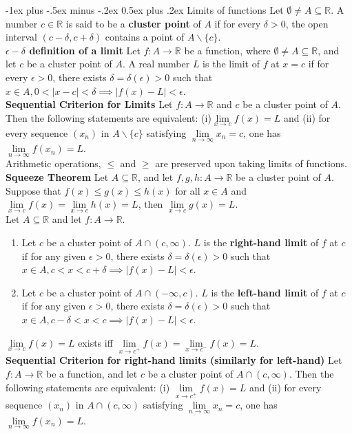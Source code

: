 \documentclass[10pt,landscape]{article}
\makeatletter
\renewcommand{\section}{\@startsection{section}{1}{0mm}%
                                {-1ex plus -.5ex minus -.2ex}%
                                {0.5ex plus .2ex}%
                                {\normalfont\large\bfseries}}
\makeatother
\begin{document}
\begin{multicols}{3}
\section{Limits of functions}
Let $\emptyset\neq A\subseteq\mathbb{R}$. A number  $c\in\mathbb{R}$ is said to be a \textbf{cluster point} of  $A$ if for every  $\delta>0$, the open interval  $(c-\delta,c+\delta)$ contains a point of  $A\backslash\{c\}$.\\
\textbf{$\epsilon-\delta$ definition of a limit} Let $f:A\to\mathbb{R}$ be a function, where  $\emptyset\neq A\subseteq\mathbb{R}$, and let  $c$ be a cluster point of  $A$. A real number  $L$ is the limit of  $f$ at  $x=c$ if for every  $\epsilon>0$, there exists  $\delta=\delta(\epsilon)>0$ such that $x\in A, 0<|x-c|<\delta\implies |f(x)-L|<\epsilon$.\\
\textbf{Sequential Criterion for Limits} Let $f:A\to\mathbb{R}$ and  $c$ be a cluster point of $A$. Then the following statements are equivalent: (i)$\lim\limits_{x\to c}f(x)=L$ and (ii) for every sequence $(x_n)$ in  $A\backslash\{c\}$ satisfying  $\lim\limits_{n\to\infty}x_n=c$, one has  $\lim\limits_{n\to\infty}f(x_n)=L$.\\
Arithmetic operations, $\leq$ and  $\geq$ are preserved upon taking limits of functions.\\
\textbf{Squeeze Theorem} Let $A\subseteq\mathbb{R}$, and let  $f,g,h:A\to\mathbb{R}$ be a cluster point of  $A$. Suppose that  $f(x)\leq g(x)\leq h(x)$ for all $x\in A$ and  $\lim\limits_{x\to c}f(x)=\lim\limits_{x\to c}h(x)=L$, then  $\lim\limits_{x\to c}g(x)=L$.\\
Let $A\subseteq\mathbb{R}$ and let  $f:A\to\mathbb{R}$.
 \begin{enumerate}
	 \item Let $c$ be a cluster point of  $A\cap(c,\infty)$.  $L$ is the \textbf{right-hand limit} of  $f$ at  $c$ if for any given  $\epsilon>0$, there exists $\delta=\delta(\epsilon)>0$ such that  $x\in A, c<x<c+\delta\implies|f(x)-L|<\epsilon$.
	 \item Let $c$ be a cluster point of  $A\cap(-\infty, c)$.  $L$ is the \textbf{left-hand limit} of  $f$ at  $c$ if for any given  $\epsilon>0$, there exists  $\delta=\delta(\epsilon)>0$ such that  $x\in A,c-\delta<x<c\implies|f(x)-L|<\epsilon$.
\end{enumerate}
$\lim\limits_{x\to c}f(x)=L$ exists iff  $\lim\limits_{x\to c^+}f(x)=\lim\limits_{x\to c^-}f(x)=L$.\\
\textbf{Sequential Criterion for right-hand limits (similarly for left-hand)} Let $f: A\to\mathbb{R}$ be a function, and let  $c$ be a cluster point of  $A\cap(c,\infty)$. Then the following statements are equivalent: (i)  $\lim\limits_{x\to c^+}f(x)=L$ and (ii) for every sequence $(x_n)$ in  $A\cap(c,\infty)$ satisfying  $\lim\limits_{n\to\infty}x_n=c$, one has  $\lim\limits_{n\to\infty}f(x_n)=L$.\\

\end{multicols}
\end{document}
